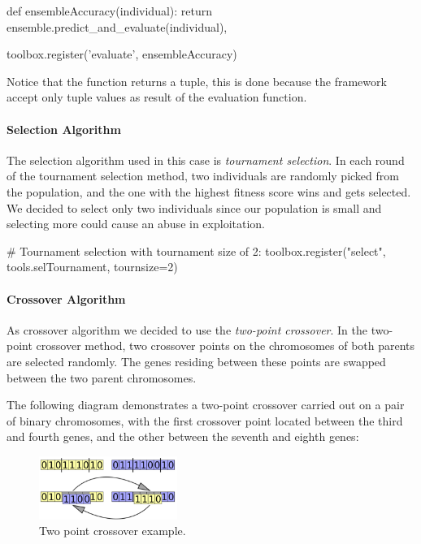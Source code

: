 \begin{python}
def ensembleAccuracy(individual):
    return ensemble.predict_and_evaluate(individual),

toolbox.register('evaluate', ensembleAccuracy)
\end{python}

Notice that the function returns a tuple, this is done because the framework accept only tuple values as result of the evaluation function.
\paragraph{Selection Algorithm}
The selection algorithm used in this case is \textit{tournament selection}. In each round of the tournament selection method, two individuals are randomly picked from the population, and the one with the highest fitness score wins and gets selected. We decided to select only two individuals since our population is small and selecting more could cause an abuse in exploitation.

\begin{python}
# Tournament selection with tournament size of 2:
toolbox.register("select", tools.selTournament, tournsize=2)
\end{python}


\paragraph{Crossover Algorithm}
As crossover algorithm we decided to use the \textit{two-point crossover}. In the two-point crossover method, two crossover points on the chromosomes of both parents are selected randomly. The genes residing between these points are swapped between the two parent chromosomes.

The following diagram demonstrates a two-point crossover carried out on a pair of binary chromosomes, with the first crossover point located between the third and fourth genes, and the other between the seventh and eighth genes:

\begin{figure}[H]
	\centering
	\includegraphics[width=0.4\textwidth]{img/twopointcross.png}
	\caption{Two point crossover example.}
	\label{fig:twopointcross}
\end{figure}

